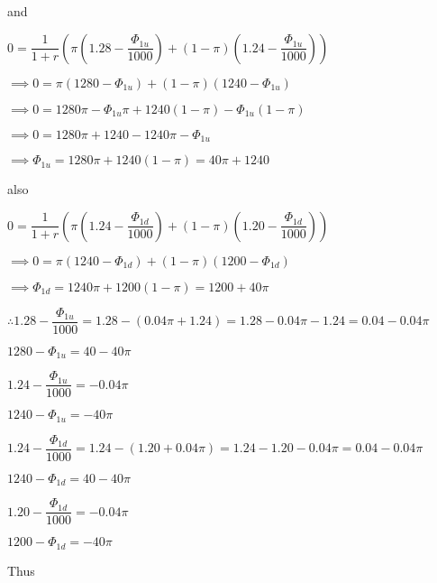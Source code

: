 \documentclass{article}
\begin{document}
and

$0=\dfrac{1}{1+r}\left(\pi\left(1.28-\dfrac{\Phi_{1u}}{1000}\right)+\left(1-\pi\right)\left(1.24-\dfrac{\Phi_{1u}}{1000}\right)\right)$

$\implies0=\pi\left(1280-\Phi_{1u}\right)+\left(1-\pi\right)\left(1240-\Phi_{1u}\right)$

$\implies0=1280\pi-\Phi_{1u}\pi+1240\left(1-\pi\right)-\Phi_{1u}\left(1-\pi\right)$

$\implies0=1280\pi+1240-1240\pi-\Phi_{1u}$

$\implies\Phi_{1u}=1280\pi+1240\left(1-\pi\right)=\boxed{40\pi+1240}$

also

$0=\dfrac{1}{1+r}\left(\pi\left(1.24-\dfrac{\Phi_{1d}}{1000}\right)+\left(1-\pi\right)\left(1.20-\dfrac{\Phi_{1d}}{1000}\right)\right)$

$\implies0=\pi\left(1240-\Phi_{1d}\right)+\left(1-\pi\right)\left(1200-\Phi_{1d}\right)$

$\implies\Phi_{1d}=1240\pi+1200\left(1-\pi\right)=\boxed{1200+40\pi}$

$\therefore1.28-\dfrac{\Phi_{1u}}{1000}=1.28-\left(0.04\pi+1.24\right)=1.28-0.04\pi-1.24=0.04-0.04\pi$

$1280-\Phi_{1u}=40-40\pi$

$1.24-\dfrac{\Phi_{1u}}{1000}=-0.04\pi$

$1240-\Phi_{1u}=-40\pi$

$1.24-\dfrac{\Phi_{1d}}{1000}=1.24-\left(1.20+0.04\pi\right)=1.24-1.20-0.04\pi=0.04-0.04\pi$

$1240-\Phi_{1d}=40-40\pi$

$1.20-\dfrac{\Phi_{1d}}{1000}=-0.04\pi$

$1200-\Phi_{1d}=-40\pi$

Thus
\end{document}
